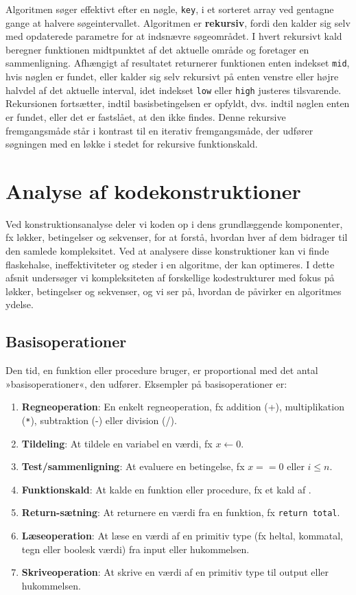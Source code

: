Algoritmen søger effektivt efter en nøgle, \texttt{key}, i et sorteret array ved gentagne gange at halvere søgeintervallet. Algoritmen er \textbf{rekursiv}, fordi den kalder sig selv med opdaterede parametre for at indsnævre søgeområdet. I hvert rekursivt kald beregner funktionen midtpunktet af det aktuelle område og foretager en sammenligning. Afhængigt af resultatet returnerer funktionen enten indekset \texttt{mid}, hvis nøglen er fundet, eller kalder sig selv rekursivt på enten venstre eller højre halvdel af det aktuelle interval, idet indekset \texttt{low} eller \texttt{high} justeres tilsvarende. Rekursionen fortsætter, indtil basisbetingelsen er opfyldt, dvs. indtil nøglen enten er fundet, eller det er fastslået, at den ikke findes. Denne rekursive fremgangsmåde står i kontrast til en iterativ fremgangsmåde, der udfører søgningen med en løkke i stedet for rekursive funktionskald.

\section{Analyse af kodekonstruktioner}\label{sec:ch11-2}
Ved konstruktionsanalyse deler vi koden op i dens grundlæggende komponenter, fx løkker, betingelser og sekvenser, for at forstå, hvordan hver af dem bidrager til den samlede kompleksitet. Ved at analysere disse konstruktioner kan vi finde flaskehalse, ineffektiviteter og steder i en algoritme, der kan optimeres. I dette afsnit undersøger vi kompleksiteten af forskellige kodestrukturer med fokus på løkker, betingelser og sekvenser, og vi ser på, hvordan de påvirker en algoritmes ydelse.

\subsection*{Basisoperationer}
Den tid, en funktion eller procedure bruger, er proportional med det antal »basisoperationer«, den udfører. Eksempler på basisoperationer er:

\begin{enumerate}
    \item \textbf{Regneoperation}: En enkelt regneoperation, fx addition (+), multiplikation (\texttt{*}), subtraktion (-) eller division (/).
    \item \textbf{Tildeling}: At tildele en variabel en værdi, fx $x \gets 0$.
    \item \textbf{Test/sammenligning}: At evaluere en betingelse, fx $x == 0$ eller $i \leq n$.
    \item \textbf{Funktionskald}: At kalde en funktion eller procedure, fx et kald af .
    \item \textbf{Return-sætning}: At returnere en værdi fra en funktion, fx \texttt{return total}.
    \item \textbf{Læseoperation}: At læse en værdi af en primitiv type (fx heltal, kommatal, tegn eller boolesk værdi) fra input eller hukommelsen.
    \item \textbf{Skriveoperation}: At skrive en værdi af en primitiv type til output eller hukommelsen.
\end{enumerate}

